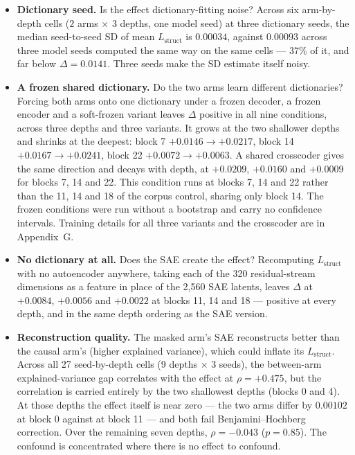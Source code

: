 \documentclass{article} %
\newcommand{\red}[1]{\textcolor{red}{#1}}
\newcommand{\opentag}[1]{\textcolor{red}{\textsuperscript{[\ref{#1}]}}}
\newcommand{\chknote}[2]{\red{[\textsc{check} \ref{#2}: #1]}}
\newcommand{\pend}[2]{\red{#1}\opentag{#2}}
\renewcommand{\red}[1]{#1}
\renewcommand{\opentag}[1]{}
\renewcommand{\chknote}[2]{}
\renewcommand{\pend}[2]{#1}
\newcommand{\Lstruct}{\ensuremath{L_{\mathrm{struct}}}}
\begin{document}
\begin{itemize}[leftmargin=1.2em]

\item \textbf{Dictionary seed.} Is the effect dictionary-fitting noise? Across six arm-by-depth
cells ($2$ arms $\times$ 3 depths, one model seed) at three dictionary seeds, the median
seed-to-seed SD of mean \Lstruct{} is $0.00034$, against $0.00093$ across three model seeds
computed the same way on the same cells --- 37\% of it, and far below $\Delta = 0.0141$. Three
seeds make the SD estimate itself noisy.

\item \textbf{A frozen shared dictionary.} Do the two arms learn different dictionaries? Forcing
both arms onto one dictionary under a frozen decoder, a frozen encoder and a soft-frozen variant
\citep{korznikov2026sanity} leaves $\Delta$ positive in all nine conditions, across three depths
and three variants. It grows at the two shallower depths and shrinks at the deepest: block 7
$+0.0146 \rightarrow +0.0217$, block 14 $+0.0167 \rightarrow +0.0241$, block 22 $+0.0072
\rightarrow +0.0063$. A shared crosscoder \citep{minder2025crosscoders} gives the same direction
and decays with depth, at $+0.0209$, $+0.0160$ and $+0.0009$ for blocks 7, 14 and 22.
\pend{This condition runs at blocks 7, 14 and 22 rather than the 11, 14 and 18 of the corpus
control, sharing only block 14.}{t:frozendepths} The frozen conditions were run without a
bootstrap and carry no confidence intervals. Training details for all three variants and the
crosscoder are in Appendix~G.

\item \textbf{No dictionary at all.} Does the SAE create the effect? Recomputing \Lstruct{} with
no autoencoder anywhere, taking each of the 320 residual-stream dimensions as a feature in place
of the 2{,}560 SAE latents, leaves $\Delta$ at $+0.0084$, $+0.0056$ and $+0.0022$ at blocks 11, 14
and 18 --- positive at every depth, and in the same depth ordering as the SAE version.

\item \textbf{Reconstruction quality.} The masked arm's SAE reconstructs better than the causal
arm's (higher explained variance), which could inflate its \Lstruct. Across all 27 seed-by-depth
cells (9 depths $\times$ 3 seeds), the between-arm explained-variance gap correlates with the
effect at $\rho = +0.475$, but the correlation is carried entirely by the two shallowest depths
(blocks 0 and 4). At those depths the effect itself is near zero --- the two arms differ by
$0.00102$ at block 0 against \chknote{$0.0161$ or $0.01719$? reconcile with
Table~\ref{tab:untrained}}{c:recon} at block 11 --- and both fail Benjamini--Hochberg correction.
Over the remaining seven depths, $\rho = -0.043$ ($p = 0.85$). The confound is concentrated where
there is no effect to confound.


\end{itemize}
\end{document}
